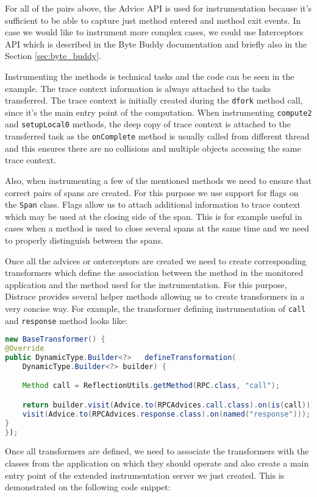 For all of the pairs above, the Advice API is used for instrumentation because it's sufficient to be able to capture just method entered and method exit events. In case we would like to instrument more complex cases, we could use Interceptors API which is described in the Byte Buddy documentation and briefly also in the Section \ref{sec:byte_buddy}.

Instrumenting the methods is technical tasks and the code can be seen in the example. The trace context information is always attached to the tasks transferred. The trace context is initially created during the \texttt{dfork} method call, since it's the main entry point of the computation. When instrumenting \texttt{compute2} and \texttt{setupLocal0} methods, the deep copy of trace context is attached to the transferred task as the \texttt{onComplete} method is usually called from different thread and this ensures there are no collisions and multiple objects accessing the same trace context.

Also, when instrumenting a few of the mentioned methods we need to ensure that correct pairs of spans are created. For this purpose we use support for flags on the \texttt{Span} class. Flags allow us to attach additional information to trace context which may be used at the closing side of the span. This is for example useful in cases when a method is used to close several spans at the same time and we need to properly distinguish between the spans.

Once all the advices or onterceptors are created we need to create corresponding transformers which define the association between the method in the monitored application and the method used for the instrumentation. For this purpose, Distrace provides several helper methods allowing us to create transformers in a very concise way. For example, the transformer defining instrumentation of \texttt{call} and \texttt{response} method looks like:

\begin{lstlisting}[language=Java]
new BaseTransformer() {
@Override
public DynamicType.Builder<?> 	defineTransformation(
	DynamicType.Builder<?> builder) {

	Method call = ReflectionUtils.getMethod(RPC.class, "call");

	return builder.visit(Advice.to(RPCAdvices.call.class).on(is(call))).
	visit(Advice.to(RPCAdvices.response.class).on(named("response")));
}
});
\end{lstlisting}


Once all transformers are defined, we need to associate the transformers with the classes from the application on which they should operate and also create a main entry point of the extended instrumentation server we just created. This is demonstrated on the following code snippet:

